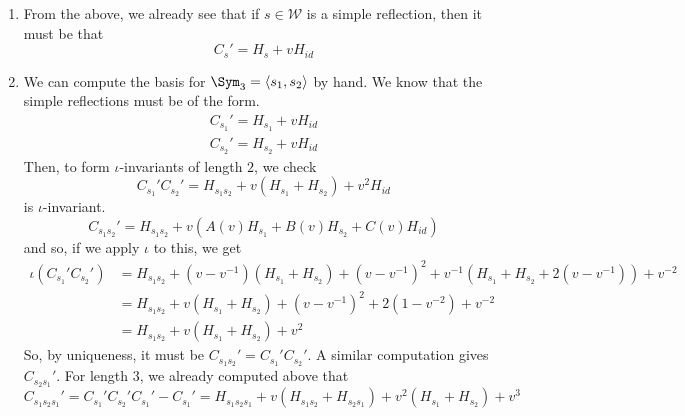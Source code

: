 \documentclass[11pt,leqno,oneside]{amsart}
\numberwithin{thm}{section}
\renewcommand{\W}{\mathcal{W}}
\begin{document}
\begin{example}
  \begin{enumerate}
  \item From the above, we already see that if \(s \in \W\) is a simple
    reflection, then it must be that \[
      C_s' = H_s+v H_{id}
    \]
  \item We can compute the basis for \(\Sym_3 = \langle s_1, s_2
    \rangle\) by hand. We know that the simple reflections must be of
    the form.
    \begin{align*}
      C_{s_1}' = H_{s_1} +vH_{id}\\
      C_{s_2}' = H_{s_2}+vH_{id}
    \end{align*}
    Then, to form \(\iota\)-invariants of length \(2\), we check \[
      C_{s_1}' C_{s_2}' = H_{s_1 s_2} + v(H_{s_1}+H_{s_2}) + v^2 H_{id}
    \]
    is \(\iota\)-invariant. 
    \[
      C_{s_1 s_2}' = H_{s_1 s_2} + v(A(v)H_{s_1}+B(v)H_{s_2} + C(v)H_{id})
    \]
    and so, if we apply \(\iota\) to this, we get
    \begin{align*}
      \iota (C_{s_1}' C_{s_2}')
      & = H_{s_1 s_2}+(v-v^{-1})(H_{s_1} + H_{s_2})+(v-v^{-1})^2 +
        v^{-1}(H_{s_1} + H_{s_2}+2(v-v^{-1})) + v^{-2} \\
      & = H_{s_1 s_2} + v(H_{s_1}+H_{s_2}) + (v-v^{-1})^2 +
        2(1-v^{-2}) + v^{-2} \\
      & = H_{s_1 s_2} + v(H_{s_1}+H_{s_2}) + v^2
    \end{align*}
    So, by uniqueness, it must be \(C_{s_1 s_2}' = C_{s_1}'
    C_{s_2}'\). A similar computation gives \(C_{s_2 s_1}'\). For
    length \(3\), we already computed above that \[
      C_{s_1 s_2 s_1}' = C_{s_1}' C_{s_2}' C_{s_1}' - C_{s_1}' =
      H_{s_1 s_2 s_1} + v(H_{s_1 s_2} + H_{s_2 s_1}) +
      v^2(H_{s_1}+H_{s_2}) + v^3
    \]
  \end{enumerate}
\end{example}
\end{document}

